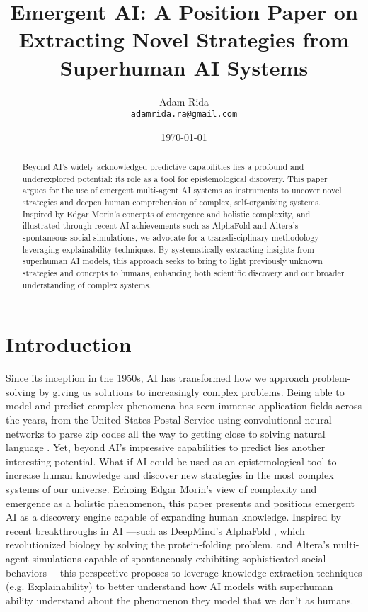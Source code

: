 \documentclass[11pt]{article}
\title{\textbf{Emergent AI: A Position Paper on Extracting Novel Strategies from Superhuman AI Systems}}
\author{Adam Rida \\ \small{\texttt{adamrida.ra@gmail.com}}}
\date{\today}
\begin{document}
\maketitle

\begin{abstract}
Beyond AI’s widely acknowledged predictive capabilities lies a profound and underexplored potential: its role as a tool for epistemological discovery. This paper argues for the use of emergent multi-agent AI systems as instruments to uncover novel strategies and deepen human comprehension of complex, self-organizing systems. Inspired by Edgar Morin's concepts of emergence and holistic complexity, and illustrated through recent AI achievements such as AlphaFold \cite{alphafold} and Altera's \cite{altera} spontaneous social simulations, we advocate for a transdisciplinary methodology leveraging explainability techniques. By systematically extracting insights from superhuman AI models, this approach seeks to bring to light previously unknown strategies and concepts to humans, enhancing both scientific discovery and our broader understanding of complex systems.
\end{abstract}


\section{Introduction}
Since its inception in the 1950s, AI has transformed how we approach problem-solving by giving us solutions to increasingly complex problems. Being able to model and predict complex phenomena has seen immense application fields across the years, from the United States Postal Service using convolutional neural networks \cite{uspscnn} to parse zip codes all the way to getting close to solving natural language \cite{nltp}.
Yet, beyond AI's impressive capabilities to predict lies another interesting potential. What if AI could be used as an epistemological tool to increase human knowledge and discover new strategies in the most complex systems of our universe. Echoing Edgar Morin's \cite{morin} view of complexity and emergence as a holistic phenomenon, this paper presents and positions emergent AI as a discovery engine capable of expanding human knowledge.
Inspired by recent breakthroughs in AI —such as DeepMind's AlphaFold \cite{alphafold}, which revolutionized biology by solving the protein-folding problem, and Altera's multi-agent simulations capable of spontaneously exhibiting sophisticated social behaviors \cite{altera}—this perspective proposes to leverage knowledge extraction techniques (e.g. Explainability) to better understand how AI models with superhuman ability understand about the phenomenon they model that we don't as humans.
\end{document}
